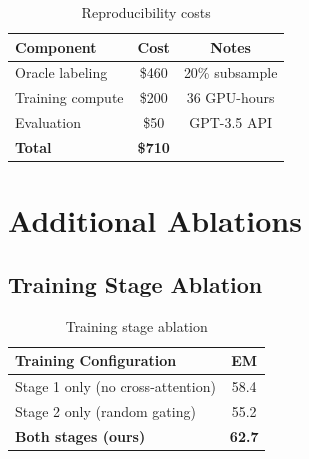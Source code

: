 \documentclass[10pt,twocolumn]{article}
\begin{document}
\begin{table}[h]
\centering
\caption{Reproducibility costs}
\small
\begin{tabular}{@{}lcc@{}}
\toprule
\textbf{Component} & \textbf{Cost} & \textbf{Notes} \\
\midrule
Oracle labeling & \$460 & 20\% subsample \\
Training compute & \$200 & 36 GPU-hours \\
Evaluation & \$50 & GPT-3.5 API \\
\midrule
\textbf{Total} & \textbf{\$710} & \\
\bottomrule
\end{tabular}
\end{table}

\section{Additional Ablations}
\label{app:ablations}

\subsection{Training Stage Ablation}

\begin{table}[h]
\centering
\caption{Training stage ablation}
\small
\begin{tabular}{@{}lc@{}}
\toprule
\textbf{Training Configuration} & \textbf{EM} \\
\midrule
Stage 1 only (no cross-attention) & 58.4 \\
Stage 2 only (random gating) & 55.2 \\
\textbf{Both stages (ours)} & \textbf{62.7} \\
\bottomrule
\end{tabular}
\end{table}
\end{document}
